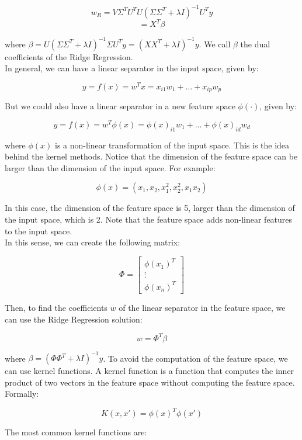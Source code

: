$$w_R = V \Sigma^T U^T U (\Sigma \Sigma^T + \lambda I)^{-1} U^T y$$
$$= X^T \beta$$

where $\beta = U (\Sigma \Sigma^T + \lambda I)^{-1} \Sigma U^T y = (X X^T + \lambda I)^{-1} y$. 
We call $\beta$ the dual coefficients of the Ridge Regression.\\

In general, we can have a linear separator in the input space, given by:

$$y = f(x) = w^T x = x_{i1} w_1 + \ldots + x_{ip} w_p$$

But we could also have a linear separator in a new feature space $\phi(\cdot)$, given by:

$$y = f(x) = w^T \phi(x) = \phi(x)_{i1} w_1 + \ldots + \phi(x)_{id} w_d$$

where $\phi(x)$ is a non-linear transformation of the input space. This is the idea behind the kernel methods.
Notice that the dimension of the feature space can be larger than the dimension of the input space. For example:

$$\phi(x) = (x_1, x_2, x_1^2, x_2^2, x_1 x_2)$$

In this case, the dimension of the feature space is 5, larger than the dimension of the input space,
which is 2. Note that the feature space adds non-linear features to the input space.\\

In this sense, we can create the following matrix:

$$\Phi = \begin{bmatrix}
    \phi(x_1)^T \\
    \vdots \\
    \phi(x_n)^T
\end{bmatrix}$$

Then, to find the coefficients $w$ of the linear separator in the feature space, we can use the Ridge Regression
solution:

$$w = \Phi^T \beta$$

where $\beta = (\Phi \Phi^T + \lambda I)^{-1} y$. To avoid the computation of the feature space, we can use
kernel functions. A kernel function is a function that computes the inner product of two vectors in the feature
space without computing the feature space. Formally:

\begin{equation}
    K(x, x') = \phi(x)^T \phi(x')
\end{equation}

The most common kernel functions are:

